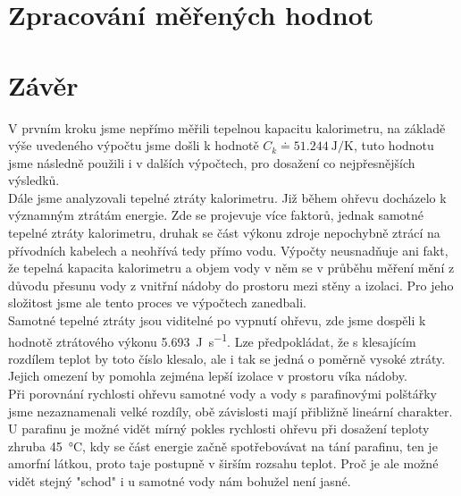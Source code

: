\documentclass{protokol}
\begin{document}

\section{Zpracování měřených hodnot}

\clearpage
\section{Závěr}
	V prvním kroku jsme nepřímo měřili tepelnou kapacitu kalorimetru, na základě výše uvedeného výpočtu jsme došli k hodnotě \(C_k \doteq \qty{51,244}{\joule\per\kelvin}\), tuto hodnotu jsme následně použili i v dalších výpočtech, pro dosažení co nejpřesnějších výsledků. 
\\

	Dále jsme analyzovali tepelné ztráty kalorimetru. Již během ohřevu docházelo k významným ztrátám energie. Zde se projevuje více faktorů, jednak samotné tepelné ztráty kalorimetru, druhak se část výkonu zdroje nepochybně ztrácí na přívodních kabelech a neohřívá tedy přímo vodu. Výpočty neusnadňuje ani fakt, že tepelná kapacita kalorimetru a objem vody v něm se v průběhu měření mění z důvodu přesunu vody z vnitřní nádoby do prostoru mezi stěny a izolaci. Pro jeho složitost jsme ale tento proces ve výpočtech zanedbali.
\\

	Samotné tepelné ztráty jsou viditelné po vypnutí ohřevu, zde jsme dospěli k hodnotě ztrátového výkonu \qty{5,693}{\joule\per\second}. Lze předpokládat, že s klesajícím rozdílem teplot by toto číslo klesalo, ale i tak se jedná o poměrně vysoké ztráty. Jejich omezení by pomohla zejména lepší izolace v prostoru víka nádoby.
\\

	Při porovnání rychlosti ohřevu samotné vody a vody s parafinovými polštářky jsme nezaznamenali velké rozdíly, obě závislosti mají přibližně lineární charakter. U parafinu je možné vidět mírný pokles rychlosti ohřevu při dosažení teploty zhruba \qty{45}{\degreeCelsius}, kdy se část energie začně spotřebovávat na tání parafinu, ten je amorfní látkou, proto taje postupně v širším rozsahu teplot. Proč je ale možné vidět stejný "schod" i u samotné vody nám bohužel není jasné. 
\end{document}

